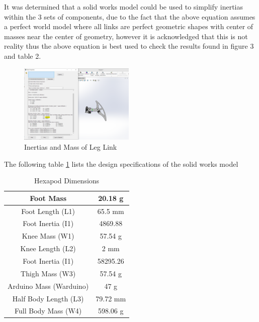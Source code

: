 It was determined that a solid works model could be used to simplify inertias within the 3 sets of components, due to the fact that the above equation assumes a perfect world model where all links are perfect geometric shapes with center of masses near the center of geometry, however it is acknowledged that this is not reality thus the above equation is best used to check the results found in figure 3 and table 2.

\begin{figure}[h]
 \centering
   \includegraphics[width = 0.49\textwidth]{figures/10.png}                \caption{Inertias and Mass of Leg Link}
   \label{fig:Inertias and Mass of Leg Link}
\end{figure}

The following table \ref{tab2} lists the design specifications of the solid works model

\begin{table}[htbp]
	\caption{Hexapod Dimensions}
	\begin{center}
		\begin{tabular}{|c|c|}
			\hline  
			Foot Mass & 20.18 g \\
			\hline
			Foot Length (L1) & 65.5 mm\\
			\hline
			Foot Inertia (I1) & 4869.88\\
			\hline
			Knee Mass (W1) & 57.54 g\\
			\hline
			Knee Length (L2) & 2 mm\\
			\hline
			Foot Inertia (I1) & 58295.26\\
			\hline
			Thigh Mass (W3) & 57.54 g\\
			\hline
			Arduino Mass (Warduino) & 47 g\\
			\hline
			Half Body Length (L3) & 79.72 mm\\
			\hline
			Full Body Mass (W4) & 598.06 g \\
		 	\hline
			
		\end{tabular}
		\end{center}
	\label{tab2}
	
\end{table}


